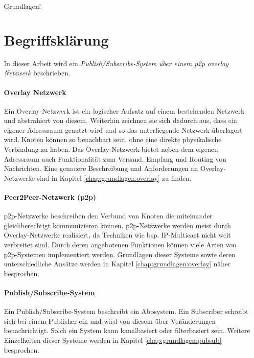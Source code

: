 Grundlagen!
\section{Begriffsklärung}
In dieser Arbeit wird ein \emph{Publish/Subscribe-System über einem p2p overlay Netzwerk} beschrieben.

\paragraph{Overlay Netzwerk} Ein Overlay-Netzwerk ist ein logischer Aufsatz auf einem bestehenden Netzwerk und abstrahiert von diesem. Weiterhin zeichnen sie sich dadurch aus, dass ein eigener Adressraum genutzt wird und so das unterliegende Netzwerk überlagert wird. Knoten können so benachbart sein, ohne eine direkte physikalische Verbindung zu haben. Das Overlay-Netzwerk bietet neben dem eigenen Adressraum auch Funktionalität zum Versand, Empfang und Routing von Nachrichten. Eine genauere Beschreibung und Anforderungen an Overlay-Netzwerke sind in Kapitel \ref{chap:grundlagen:overlay} zu finden.


\paragraph{Peer2Peer-Netzwerk (p2p)} p2p-Netzwerke beschreiben den Verbund von Knoten die miteinander gleichberechtigt kommunizieren können. p2p-Netzwerke werden meist durch Overlay-Netzwerke realisiert, da Techniken wie bsp. IP-Multicast nicht weit verbreitet sind. Durch deren angebotenen Funktionen können viele Arten von p2p-Systemen implementiert werden. Grundlagen dieser Systeme sowie deren unterschiedliche Ansätze werden in Kapitel \ref{chap:grundlagen:overlay} näher besprochen.


\paragraph{Publish/Subscribe-System} Ein Publish/Subscribe-System beschreibt ein Abosystem. Ein Subscriber schreibt sich bei einem Publisher ein und wird von diesem über Veränderungen benachrichtigt. Solch ein System kann kanalbasiert oder filterbasiert sein. Weitere Einzelheiten dieser Systeme werden in Kapitel \ref{chap:grundlagen:pubsub} besprochen.


